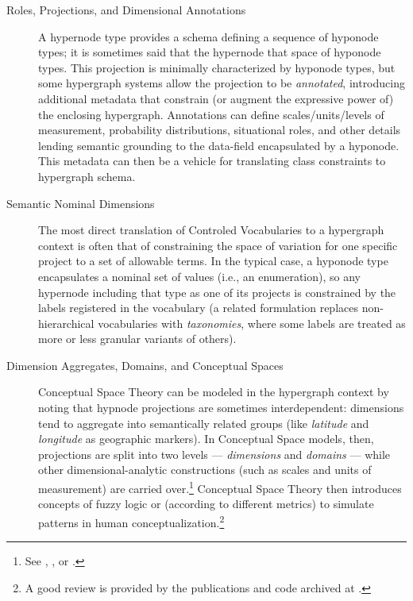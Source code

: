 {\begin{description}
\item[Roles, Projections, and Dimensional Annotations]
A hypernode type provides a schema defining a 
sequence of hyponode types; it is sometimes 
said that the hypernode  that 
space of hyponode types.  This projection is 
minimally characterized by hyponode types, 
but some hypergraph systems allow the 
projection to be \textit{annotated}, introducing 
additional metadata that constrain 
(or augment the expressive power of) the 
enclosing hypergraph.  Annotations can 
define scales/units/levels of measurement, 
probability distributions, situational roles, 
and other details lending semantic grounding 
to the data-field encapsulated by a hyponode.  
This metadata can then be a vehicle for 
translating \RDF{} class constraints to 
hypergraph schema. 

\item[Semantic Nominal Dimensions]
The most direct translation of 
Controled Vocabularies to a hypergraph context 
is often that of constraining the space 
of variation for one specific project to 
a set of allowable terms.  In the typical 
case, a hyponode type encapsulates a 
nominal set of values (i.e., an enumeration), 
so any hypernode including that type as one 
of its projects is constrained by the 
labels registered in the vocabulary 
(a related formulation replaces 
non-hierarchical vocabularies with 
\textit{taxonomies}, where some labels 
are treated as more or less granular 
variants of others).

\item[Dimension Aggregates, Domains, and Conceptual Spaces]
Conceptual Space Theory can be modeled in the 
hypergraph context by noting that hypnode 
projections are sometimes interdependent: 
dimensions tend to aggregate into semantically 
related groups (like \textit{latitude} and 
\textit{longitude} as geographic markers).  
In Conceptual Space models, then, 
projections are split into two 
levels --- \textit{dimensions} and 
\textit{domains} --- while other 
dimensional-analytic constructions 
(such as scales and units of measurement) are 
carried over.\footnote{See , 
, 
or .}  
Conceptual Space Theory then introduces 
concepts of fuzzy logic or  
(according to different metrics) to simulate 
patterns in human 
conceptualization.\footnote{A good review is 
provided by the publications and code archived 
at .}
  

\end{description}}

